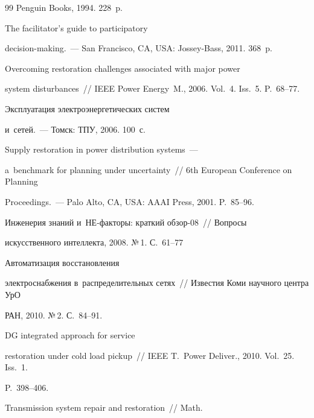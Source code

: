 {{\begin{thebibliography}{99}
Penguin Books, 1994. 228~p.







   The facilitator's guide to participatory 


decision-making.~--- San Francisco, CA, USA: Jossey-Bass, 2011. 368~p.




   Overcoming restoration challenges associated with major power 


system disturbances~/\!\!/ IEEE Power Energy~M., 2006. Vol.~4. Iss.~5. P.~68--77.




   Эксплуатация электроэнергетических систем 


и~сетей.~--- Томск: ТПУ, 2006. 100~с.




   Supply restoration in power distribution systems~--- 


a~benchmark for planning under uncertainty~/\!\!/ 6th European Conference on Planning 


Proceedings.~--- Palo Alto, CA, USA: AAAI Press, 2001. P.~85--96.




   Инженерия знаний и~НЕ-факторы: краткий обзор-08~/\!\!/ Вопросы 


искусственного интеллекта, 2008. №\,1. С.~61--77




   Автоматизация восстановления 


электроснабжения в~распределительных сетях~/\!\!/ Известия Коми научного центра УрО 


РАН, 2010. №\,2. С.~84--91.




   DG integrated approach for service 


restoration under cold load pickup~/\!\!/ IEEE T.~Power Deliver., 2010. Vol.~25. Iss.~1. 


P.~398--406.




   Transmission system repair and restoration~/\!\!/ Math.



\end{thebibliography}}}
